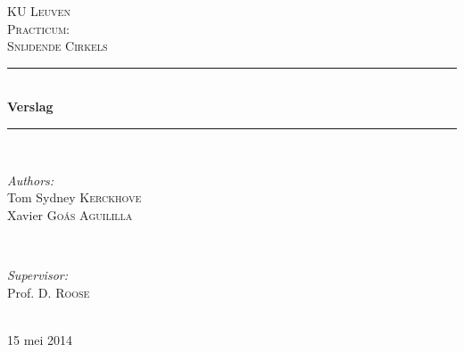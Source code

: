 \begin{titlepage}

\newcommand{\HRule}{\rule{\linewidth}{0.5mm}}
\center
\textsc{\LARGE KU Leuven}\\[1.5cm]
\textsc{\Large Practicum:}\\[0.5cm]
\textsc{\large Snijdende Cirkels}\\[0.5cm]

\HRule \\[0.4cm]
{ \huge \bfseries Verslag}\\[0.4cm]
\HRule \\[1.5cm]

\begin{minipage}{0.4\textwidth}
\begin{flushleft} \large
\emph{Authors:}\\
Tom Sydney \textsc{Kerckhove}\\
Xavier \textsc{Go\'as Aguililla}
\end{flushleft}
\end{minipage}
~
\begin{minipage}{0.4\textwidth}
\begin{flushright} \large
\emph{Supervisor:} \\
Prof. D. \textsc{Roose}
\end{flushright}
\end{minipage}\\[4cm]

{\large 15 mei 2014}\\[3cm]
\vfill

\end{titlepage}
